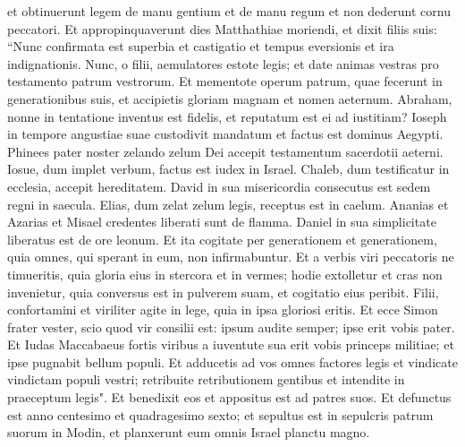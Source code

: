 \begin{biblechapter}
\verse et obtinuerunt legem de manu gentium et de manu regum et non dederunt cornu peccatori. 
\verse Et appropinquaverunt dies Matthathiae moriendi, et dixit filiis suis: “Nunc confirmata est superbia et castigatio et tempus eversionis et ira indignationis.  
\verse Nunc, o filii, aemulatores estote legis; et date animas vestras pro testamento patrum vestrorum. 
\verse Et mementote operum patrum, quae fecerunt in generationibus suis, et accipietis gloriam magnam et nomen aeternum. 
\verse Abraham, nonne in tentatione inventus est fidelis, et reputatum est ei ad iustitiam? 
\verse Ioseph in tempore angustiae suae custodivit mandatum et factus est dominus Aegypti. 
\verse Phinees pater noster zelando zelum Dei accepit testamentum sacerdotii aeterni. 
\verse Iosue, dum implet verbum, factus est iudex in Israel. 
\verse Chaleb, dum testificatur in ecclesia, accepit hereditatem. 
\verse David in sua misericordia consecutus est sedem regni in saecula. 
\verse Elias, dum zelat zelum legis, receptus est in caelum. 
\verse Ananias et Azarias et Misael credentes liberati sunt de flamma. 
\verse Daniel in sua simplicitate liberatus est de ore leonum. 
\verse Et ita cogitate per generationem et generationem, quia omnes, qui sperant in eum, non infirmabuntur.  
\verse Et a verbis viri peccatoris ne timueritis, quia gloria eius in stercora et in vermes; 
\verse hodie extolletur et cras non invenietur, quia conversus est in pulverem suam, et cogitatio eius peribit. 
\verse Filii, confortamini et viriliter agite in lege, quia in ipsa gloriosi eritis. 
\verse Et ecce Simon frater vester, scio quod vir consilii est: ipsum audite semper; ipse erit vobis pater. 
\verse Et Iudas Maccabaeus fortis viribus a iuventute sua erit vobis princeps militiae; et ipse pugnabit bellum populi.  
\verse Et adducetis ad vos omnes factores legis et vindicate vindictam populi vestri; 
\verse retribuite retributionem gentibus et intendite in praeceptum legis". 
\verse Et benedixit eos et appositus est ad patres suos. 
\verse Et defunctus est anno centesimo et quadragesimo sexto; et sepultus est in sepulcris patrum suorum in Modin, et planxerunt eum omnis Israel planctu magno. 
\end{biblechapter}

